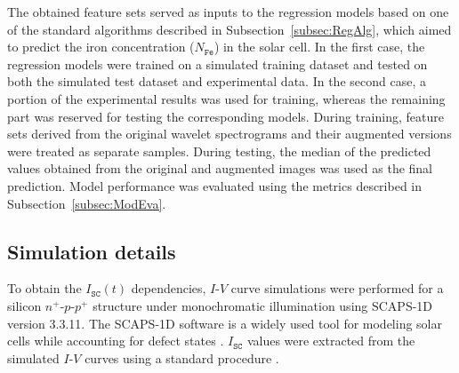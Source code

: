\documentclass[10pt]{iopart}
\begin{document}
The obtained feature sets served as  inputs to the regression models based on one of the standard algorithms described in Subsection~\ref{subsec:RegAlg},
which aimed to predict the iron concentration ($N_\mathtt{Fe}$) in the solar cell.
In the first case, the regression models were trained on a simulated training dataset and tested on both the simulated test dataset and experimental data.
In the second case, a portion of the experimental results was used for training, whereas the remaining part was reserved for testing the corresponding models.
During training, feature sets derived from the original wavelet spectrograms and their augmented versions were treated as separate samples.
During testing, the median of the predicted values obtained from the original and augmented images was used as the final prediction.
Model performance was evaluated using the metrics described in Subsection~\ref{subsec:ModEva}.


\subsection{Simulation details}\label{subsec:SimDet}

To obtain the $I_\mathtt{SC}(t)$ dependencies, $I$-$V$ curve simulations were performed for a silicon $n^+$-$p$-$p^+$ structure
under monochromatic illumination using SCAPS-1D version 3.3.11.
The SCAPS-1D software \cite{SCAPS1} is a widely used tool for modeling solar cells
while accounting for defect states \cite{MasumMia2025, Joshi2024, Ravidas2024, Liu2024, You2023, SCAPSDefect3}.
$I_\mathtt{SC}$ values were extracted from the simulated $I$-$V$ curves using a standard procedure \cite{SCparam2017}.
\end{document}
